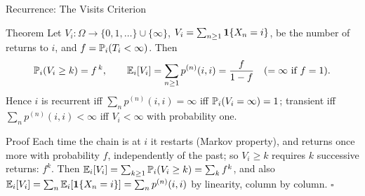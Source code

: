 \begin{frame}{Recurrence: The Visits Criterion}
  \label{fr:visits}
  \small
  \begin{block}{Theorem}
    Let $V_i\colon\Omega\to\{0,1,\dots\}\cup\{\infty\}$, $V_i=\sum_{n\ge1}\mathbf{1}\{X_n=i\}$, be the number of returns to $i$, and $f=\mathbb{P}_i(T_i<\infty)$. Then
    \[
      \mathbb{P}_i(V_i\ge k)=f^{\,k},\qquad \mathbb{E}_i[V_i]=\sum_{n\ge1}p^{(n)}(i,i)=\frac{f}{1-f}\quad(=\infty\text{ if } f=1).
    \]
    Hence $i$ is recurrent iff $\sum_n p^{(n)}(i,i)=\infty$ iff $\mathbb{P}_i(V_i=\infty)=1$; transient iff $\sum_n p^{(n)}(i,i)<\infty$ iff $V_i<\infty$ with probability one.
  \end{block}
  \begin{block}{Proof}
    Each time the chain is at $i$ it restarts (Markov property), and returns once more with probability $f$, independently of the past; so $V_i\ge k$ requires $k$ successive returns: $f^k$. Then $\mathbb{E}_i[V_i]=\sum_{k\ge1}\mathbb{P}_i(V_i\ge k)=\sum_kf^k$, and also $\mathbb{E}_i[V_i]=\sum_n\mathbb{E}_i[\mathbf{1}\{X_n=i\}]=\sum_np^{(n)}(i,i)$ by linearity, column by column. \hfill$\square$
  \end{block}
\end{frame}

